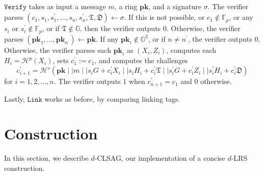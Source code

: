 \documentclass[draft]{llncs} %
\begin{document}
\begin{example}
$\texttt{Verify}$ takes as input a message $m$, a ring $\underline{\textbf{pk}}$, and a signature $\sigma$. The verifier parses $(c_1, s_1, s_1^\prime, \ldots, s_n, s_n^\prime, \mathfrak{T}, \mathfrak{D}) \leftarrow \sigma$. If this is not possible, or $c_1 \notin \mathbb{F}_p$, or any $s_i$ or $s_i^\prime \notin \mathbb{F}_p$, or if $\mathfrak{T} \notin \mathbb{G}$, then the verifier outputs $0$. Otherwise, the verifier parses $(\textbf{pk}_1, \ldots, \textbf{pk}_{n^\prime}) \leftarrow \underline{\textbf{pk}}$. If any $\textbf{pk}_i \notin \mathbb{G}^2$, or if $n \neq n^\prime$, the verifier outputs $0$. Otherwise, the verifier parses each $\textbf{pk}_i$ as $(X_i, Z_i)$, computes each $H_i = \mathcal{H}^p(X_i)$, sets $c_1^\prime := c_1$, and computes the challenges $$c_{i+1}^\prime = \mathcal{H}^s(\textbf{pk} \mid \mid m \mid \mid s_i G + c_i^\prime X_i \mid \mid s_i H_i + c_i^\prime \mathfrak{T} \mid \mid s_i^\prime G + c_i^\prime Z_i \mid \mid s_i^\prime H_i + c_i^\prime \mathfrak{D})$$ for $i=1, 2, \ldots, n$. The verifier outputs $1$ when $c_{n+1}^\prime = c_1$ and $0$ otherwise.

Lastly, $\texttt{Link}$ works as before, by comparing linking tags.
\end{example}


\section{Construction}\label{sec:construction}
In this section, we describe $d$-CLSAG, our implementation of a concise $d$-LRS construction.
\end{document}
